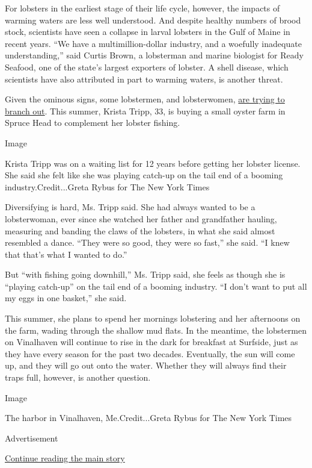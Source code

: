 For lobsters in the earliest stage of their life cycle, however, the
impacts of warming waters are less well understood. And despite healthy
numbers of brood stock, scientists have seen a collapse in larval
lobsters in the Gulf of Maine in recent years. ``We have a
multimillion-dollar industry, and a woefully inadequate understanding,''
said Curtis Brown, a lobsterman and marine biologist for Ready Seafood,
one of the state's largest exporters of lobster. A shell disease, which
scientists have also attributed in part to warming waters, is another
threat.

Given the ominous signs, some lobstermen, and lobsterwomen,
\href{https://www.nytimes3xbfgragh.onion/interactive/2017/10/10/us/aquaculture.html}{are
trying to branch out}. This summer, Krista Tripp, 33, is buying a small
oyster farm in Spruce Head to complement her lobster fishing.

Image

Krista Tripp was on a waiting list for 12 years before getting her
lobster license. She said she felt like she was playing catch-up on the
tail end of a booming industry.Credit...Greta Rybus for The New York
Times

Diversifying is hard, Ms. Tripp said. She had always wanted to be a
lobsterwoman, ever since she watched her father and grandfather hauling,
measuring and banding the claws of the lobsters, in what she said almost
resembled a dance. ``They were so good, they were so fast,'' she said.
``I knew that that's what I wanted to do.''

But ``with fishing going downhill,'' Ms. Tripp said, she feels as though
she is ``playing catch-up'' on the tail end of a booming industry. ``I
don't want to put all my eggs in one basket,'' she said.

This summer, she plans to spend her mornings lobstering and her
afternoons on the farm, wading through the shallow mud flats. In the
meantime, the lobstermen on Vinalhaven will continue to rise in the dark
for breakfast at Surfside, just as they have every season for the past
two decades. Eventually, the sun will come up, and they will go out onto
the water. Whether they will always find their traps full, however, is
another question.

Image

The harbor in Vinalhaven, Me.Credit...Greta Rybus for The New York Times

Advertisement

\protect\hyperlink{after-bottom}{Continue reading the main story}

